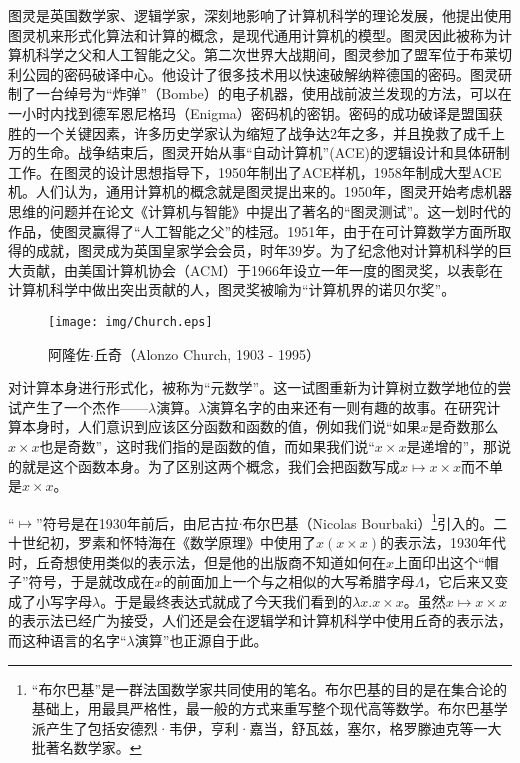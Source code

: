 \documentclass{article}
\begin{document}
图灵是英国数学家、逻辑学家，深刻地影响了计算机科学的理论发展，他提出使用图灵机来形式化算法和计算的概念，是现代通用计算机的模型。图灵因此被称为计算机科学之父和人工智能之父\cite{wiki-Turing}。第二次世界大战期间，图灵参加了盟军位于布莱切利公园的密码破译中心。他设计了很多技术用以快速破解纳粹德国的密码。图灵研制了一台绰号为“炸弹”（Bombe）的电子机器，使用战前波兰发现的方法，可以在一小时内找到德军恩尼格玛（Enigma）密码机的密钥。密码的成功破译是盟国获胜的一个关键因素，许多历史学家认为缩短了战争达2年之多，并且挽救了成千上万的生命。战争结束后，图灵开始从事“自动计算机”(ACE)的逻辑设计和具体研制工作。在图灵的设计思想指导下，1950年制出了ACE样机，1958年制成大型ACE机。人们认为，通用计算机的概念就是图灵提出来的。1950年，图灵开始考虑机器思维的问题并在论文《计算机与智能》中提出了著名的“图灵测试”。这一划时代的作品，使图灵赢得了“人工智能之父”的桂冠。1951年，由于在可计算数学方面所取得的成就，图灵成为英国皇家学会会员，时年39岁。为了纪念他对计算机科学的巨大贡献，由美国计算机协会（ACM）于1966年设立一年一度的图灵奖，以表彰在计算机科学中做出突出贡献的人，图灵奖被喻为“计算机界的诺贝尔奖”。

\begin{wrapfigure}{R}{0.3\textwidth}
 \centering
 \texttt{[image: img/Church.eps]}
 \captionsetup{labelformat=empty}
 \caption{阿隆佐$\cdot$丘奇（Alonzo Church, 1903 - 1995）}
 \label{fig:Church}
\end{wrapfigure}

对计算本身进行形式化，被称为“元数学”。这一试图重新为计算树立数学地位的尝试产生了一个杰作——$\lambda$演算。$\lambda$演算名字的由来还有一则有趣的故事。在研究计算本身时，人们意识到应该区分函数和函数的值，例如我们说“如果$x$是奇数那么$x \times x$也是奇数”，这时我们指的是函数的值，而如果我们说“$x \times x$是递增的”，那说的就是这个函数本身。为了区别这两个概念，我们会把函数写成$x \mapsto x \times x$而不单是$x \times x$。

“$\mapsto$”符号是在1930年前后，由尼古拉$\cdot$布尔巴基（Nicolas Bourbaki）\footnote{“布尔巴基”是一群法国数学家共同使用的笔名。布尔巴基的目的是在集合论的基础上，用最具严格性，最一般的方式来重写整个现代高等数学。布尔巴基学派产生了包括安德烈·韦伊，亨利·嘉当，舒瓦兹，塞尔，格罗滕迪克等一大批著名数学家。}引入的。二十世纪初，罗素和怀特海在《数学原理》中使用了$\hat{x}(x \times x)$的表示法，1930年代时，丘奇想使用类似的表示法，但是他的出版商不知道如何在$x$上面印出这个“帽子”符号，于是就改成在$x$的前面加上一个与之相似的大写希腊字母$\Lambda$，它后来又变成了小写字母$\lambda$。于是最终表达式就成了今天我们看到的$\lambda x . x \times x$\cite{Dowek2011}。虽然$x \mapsto x \times x$的表示法已经广为接受，人们还是会在逻辑学和计算机科学中使用丘奇的表示法，而这种语言的名字“$\lambda$演算”也正源自于此。
\end{document}
